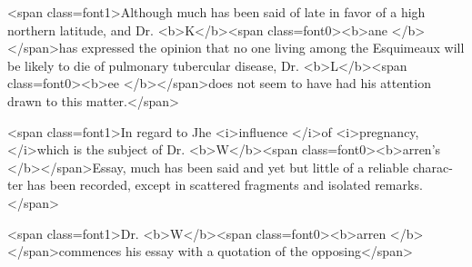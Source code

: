 <span class=font1>Although much has been said of late in favor of a high northern
latitude, and Dr. <b>K</b><span class=font0><b>ane </b></span>has expressed the opinion that no one living
among the Esquimeaux will be likely to die of pulmonary tubercular
disease, Dr. <b>L</b><span class=font0><b>ee </b></span>does not seem to have had his attention drawn to this
matter.</span>

<span class=font1>In regard to Jhe <i>influence </i>of <i>pregnancy, </i>which is the subject of Dr.
<b>W</b><span class=font0><b>arren's </b></span>Essay, much has been said and yet but little of a reliable charac-
ter has been recorded, except in scattered fragments and isolated remarks.</span>

<span class=font1>Dr. <b>W</b><span class=font0><b>arren </b></span>commences his essay with a quotation of the opposing</span>
